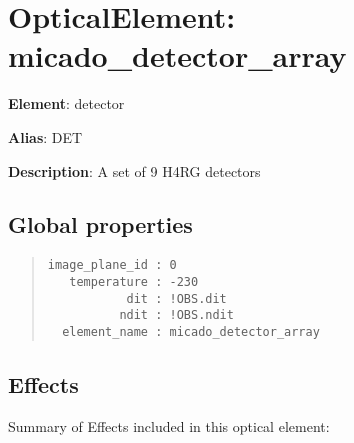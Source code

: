 

\section{OpticalElement: \textquotedbl{}micado\_detector\_array\textquotedbl{}%
  \label{opticalelement-micado-detector-array}%
}

\textbf{Element}: detector

\textbf{Alias}: DET

\textbf{Description}: A set of 9 H4RG detectors


\subsection{Global properties%
  \label{global-properties}%
}

\begin{quote}
\begin{alltt}
\begin{lstlisting}[frame=single]
image_plane_id : 0
   temperature : -230
           dit : !OBS.dit
          ndit : !OBS.ndit
  element_name : micado_detector_array
\end{lstlisting}
\end{alltt}
\end{quote}


\subsection{Effects%
  \label{effects}%
}

Summary of Effects included in this optical element:

